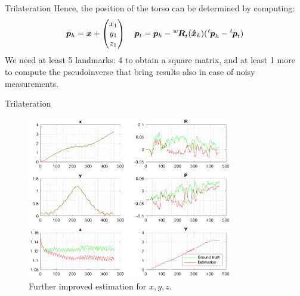 \documentclass[10pt]{beamer}
\begin{document}
    \begin{frame}[fragile]{Trilateration}
        \justifying
        Hence, the position of the torso can be determined by computing:
        \begin{equation*}
            \bm{p}_h
                =
            \bm{x} +
            \begin{pmatrix}
                x_1 \\
                y_1 \\
                z_1
            \end{pmatrix} \quad
            \bm{p}_t = \bm{p}_h - \tensor[^w]{\bm{R}}{_t}(\bm{\hat{x}}_{k}) (\tensor[^t]{\bm{p}}{_h} - \tensor[^t]{\bm{p}}{_t})
        \end{equation*}
        We need at least 5 landmarks: 4 to obtain a
        square matrix, and at least 1 more to compute the pseudoinverse that
        bring results also in case of noisy measurements.
    \end{frame}

    \begin{frame}[fragile]{Trilateration}
        \begin{figure}
        \caption{Further improved estimation for $x, y, z$.}
        \vspace{-0.3cm}
        \includegraphics[width=0.8\textwidth]{images/trilateration.png}
        \end{figure}
    \end{frame}
\end{document}
